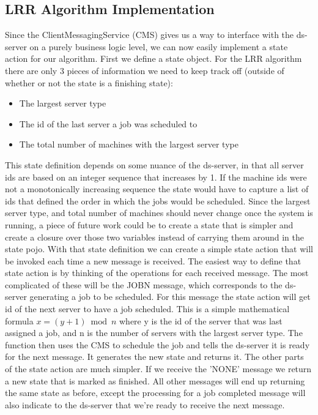 \documentclass[a4paper]{article} %
\begin{document}
\subsection*{LRR Algorithm Implementation}
Since the ClientMessagingService (CMS) gives us a way to interface with the ds-server on a purely business logic level, we can now easily implement a state action for our algorithm.
First we define a state object. For the LRR algorithm there are only 3 pieces of information we need to keep track off (outside of whether or not the state is a finishing state):
\begin{itemize}
    \item The largest server type
    \item The id of the last server a job was scheduled to
    \item The total number of machines with the largest server type
\end{itemize}
This state definition depends on some nuance of the ds-server, in that all server ids are based on an integer sequence that increases by 1. 
If the machine ids were not a monotonically increasing sequence the state would have to capture a list of ids that defined the order in which the jobs would be scheduled.
Since the largest server type, and total number of machines should never change once the system is running, a piece of future work could be to create a state that is simpler and create a closure over those two variables instead of carrying them around in the state pojo.
\newline
With that state definition we can create a simple state action that will be invoked each time a new message is received. 
The easiest way to define that state action is by thinking of the operations for each received message. The most complicated of these will be the JOBN message, which corresponds to the ds-server generating a job to be scheduled.
For this message the state action will get id of the next server to have a job scheduled. This is a simple mathematical formula 
\begin{math}
    x = (y + 1) \bmod n
\end{math}
where y is the id of the server that was last assigned a job, and n is the number of servers with the largest server type.
The function then uses the CMS to schedule the job and tells the ds-server it is ready for the next message.
It generates the new state and returns it.
\newline
The other parts of the state action are much simpler. If we receive the 'NONE' message we return a new state that is marked as finished.
All other messages will end up returning the same state as before, except the processing for a job completed message will also indicate to the ds-server that we're ready to receive the next message.
\end{document}
